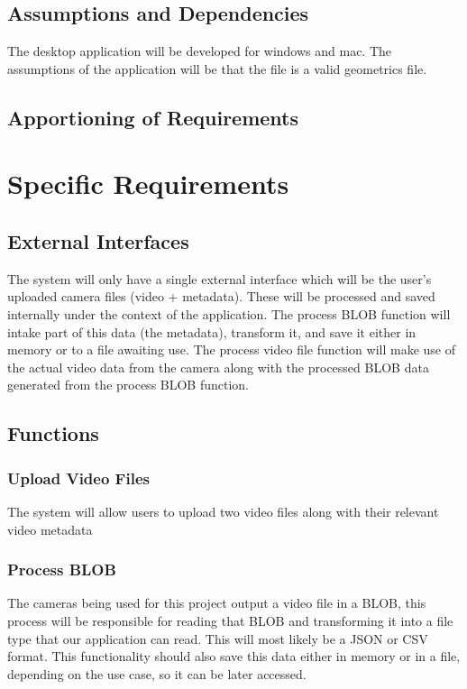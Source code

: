 \documentclass[10pt,letterpaper,onecolumn]{article}
\begin{document}
\subsection{Assumptions and Dependencies}
The desktop application will be developed for windows and mac.
The assumptions of the application will be that the file is a valid geometrics file.

\subsection{Apportioning of Requirements}
% 

\section{Specific Requirements}
\subsection{External Interfaces}
The system will only have a single external interface which will be the user’s uploaded camera files (video + metadata).
These will be processed and saved internally under the context of the application.
The process BLOB function will intake part of this data (the metadata), transform it, and save it either in memory or to a file awaiting use.
The process video file function will make use of the actual video data from the camera along with the processed BLOB data generated from the process BLOB function.

\subsection{Functions}

\subsubsection{Upload Video Files}
The system will allow users to upload two video files along with their relevant video metadata

\subsubsection{Process BLOB}
The cameras being used for this project output a video file in a BLOB, this process will be responsible for reading that BLOB and transforming it into a file type that our application can read. This will most likely be a JSON or CSV format. This functionality should also save this data either in memory or in a file, depending on the use case, so it can be later accessed.
\end{document}
